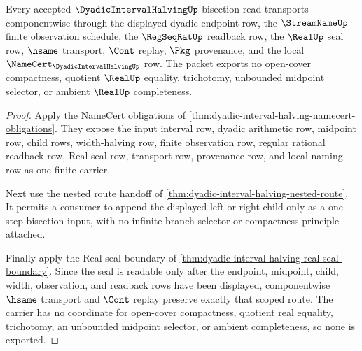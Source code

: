 \begin{theorem}
\label{thm:dyadic-interval-halving-scoped-bisection-transport}
Every accepted $\DyadicIntervalHalvingUp$ bisection read transports componentwise through the displayed dyadic endpoint row, the $\StreamNameUp$ finite observation schedule, the $\RegSeqRatUp$ readback row, the $\RealUp$ seal row, $\hsame$ transport, $\Cont$ replay, $\Pkg$ provenance, and the local $\NameCert_{\DyadicIntervalHalvingUp}$ row. The packet exports no open-cover compactness, quotient $\RealUp$ equality, trichotomy, unbounded midpoint selector, or ambient $\RealUp$ completeness.
\end{theorem}
\begin{proof}
Apply the NameCert obligations of \autoref{thm:dyadic-interval-halving-namecert-obligations}. They expose the input interval row, dyadic arithmetic row, midpoint row, child rows, width-halving row, finite observation row, regular rational readback row, Real seal row, transport row, provenance row, and local naming row as one finite carrier.

Next use the nested route handoff of \autoref{thm:dyadic-interval-halving-nested-route}. It permits a consumer to append the displayed left or right child only as a one-step bisection input, with no infinite branch selector or compactness principle attached.

Finally apply the Real seal boundary of \autoref{thm:dyadic-interval-halving-real-seal-boundary}. Since the seal is readable only after the endpoint, midpoint, child, width, observation, and readback rows have been displayed, componentwise $\hsame$ transport and $\Cont$ replay preserve exactly that scoped route. The carrier has no coordinate for open-cover compactness, quotient real equality, trichotomy, an unbounded midpoint selector, or ambient completeness, so none is exported.
\end{proof}


